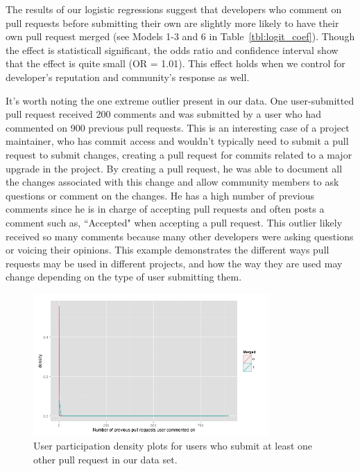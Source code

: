 \documentclass{sigchi}
\begin{document}
The results of our logistic regressions suggest that developers who comment on 
pull requests before submitting their own are slightly more likely to have 
their own pull request merged (see Models 1-3 and 6 in 
Table~\ref{tbl:logit_coef}). Though the effect is statisticall significant, the 
odds ratio and confidence interval show that the effect is quite small (OR = 
1.01). This effect holds when we control for developer's 
reputation and community's response as well. 

It's worth noting the one extreme outlier present in our data. One
user-submitted pull request received 200 comments and was submitted by a user
who had commented on 900 previous pull requests. This is an interesting case of
a project maintainer, who has commit access and wouldn't typically need to
submit a pull request to submit changes, creating a pull request for commits
related to a major upgrade in the project. By creating a pull request, he was
able to document all the changes associated with this change and allow community
members to ask questions or comment on the changes. He has a high number of
previous comments since he is in charge of accepting pull requests and often
posts a comment such as, ``Accepted" when accepting a pull request. This outlier
likely received so many comments because many other developers were asking
questions or voicing their opinions. This example demonstrates the different
ways pull requests may be used in different projects, and how the way they are
used may change depending on the type of user submitting them.

\begin{figure}[p] \centering
\includegraphics[width=0.8\textwidth]{figures/number_comments_density_repeaters_ggplot.png}
\caption{User participation density plots for users who submit at least one
other pull request in our data set.} \label{fig:repeaters} \end{figure}
\end{document}

